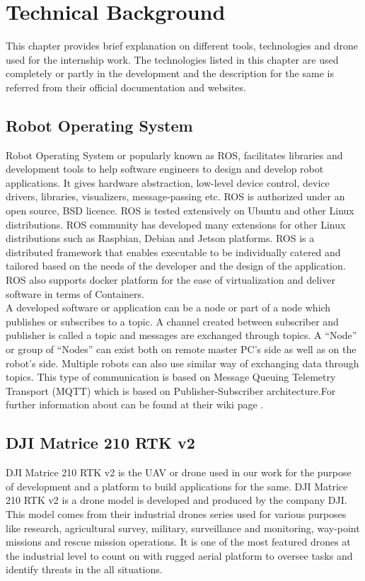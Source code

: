 \chapter{Technical Background}
\label{ch:techbg}
This chapter provides brief explanation on different tools, technologies and drone used for the internship work. The technologies listed in this chapter are used completely or partly in the development and the description for the same is referred from their official documentation and websites.

\section{Robot Operating System}
\label{sec:techbg:ROS}
Robot Operating System\cite{quigley2009ros} or popularly known as ROS, facilitates libraries and development tools to help software engineers to design and develop robot applications. It gives hardware abstraction, low-level device control, device drivers, libraries, visualizers, message-passing etc. ROS is authorized under an open source, BSD licence. ROS is tested extensively on Ubuntu and other Linux distributions. ROS community has developed many extensions for other Linux distributions such as Raspbian, Debian and Jetson platforms. ROS is a distributed framework that enables executable to be individually catered and tailored based on the needs of the developer and the design of the application. ROS also supports docker platform for the ease of virtualization and deliver software in terms of Containers.
\\

A developed software or application can be a node or part of a node which publishes or subscribes to a topic. A channel created between subscriber and publisher is called a topic and messages are exchanged through topics. A “Node” or group of “Nodes” can exist both on remote master PC’s side as well as on the robot’s side. Multiple robots can also use similar way of exchanging data through topics. This type of communication is based on Message Queuing Telemetry Transport (MQTT) which is based on Publisher-Subscriber architecture.For further information about can be found at their wiki page \cite{ROSWiki}.

\section{DJI Matrice 210 RTK v2}
\label{sec:techbg:DJIdrone}
DJI Matrice 210 RTK v2 is the UAV or drone used in our work for the purpose of development and a platform to build applications for the same. DJI Matrice 210 RTK v2 is a drone model is developed and produced by the company DJI. This model comes from their industrial drones series used for various purposes like research, agricultural survey, military, surveillance and monitoring, way-point missions and rescue mission operations. It is one of the most featured drones at the industrial level to count on with rugged aerial platform to oversee tasks and identify threats in the all situations. 

